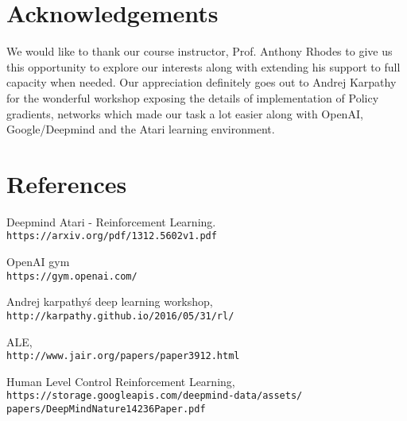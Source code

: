 \documentclass[%
 aip,
 jmp,%
 amsmath,amssymb,
 reprint,%
]{revtex4-1}
\begin{document}
\section{Acknowledgements}

We would like to thank our course instructor, Prof. Anthony Rhodes to give us this opportunity to explore our interests along with extending his support to full capacity when needed. Our appreciation definitely goes out to Andrej Karpathy for the wonderful workshop exposing the details of implementation of Policy gradients, networks which made our task a lot easier along with OpenAI, Google/Deepmind and the Atari learning environment. 

\section{References}
\vspace{-15pt}
\begin{thebibliography}{9}
Deepmind Atari - Reinforcement Learning. 
\\\texttt{https://arxiv.org/pdf/1312.5602v1.pdf} 
 
OpenAI gym 
\\\texttt{https://gym.openai.com/} 

 
Andrej karpathy\'s deep learning workshop,
\\\texttt{http://karpathy.github.io/2016/05/31/rl/}

ALE,
\\\texttt{http://www.jair.org/papers/paper3912.html}
 
Human Level Control Reinforcement Learning,
\\\texttt{https://storage.googleapis.com/deepmind-data/assets/
papers/DeepMindNature14236Paper.pdf}
\end{thebibliography}
\end{document}
